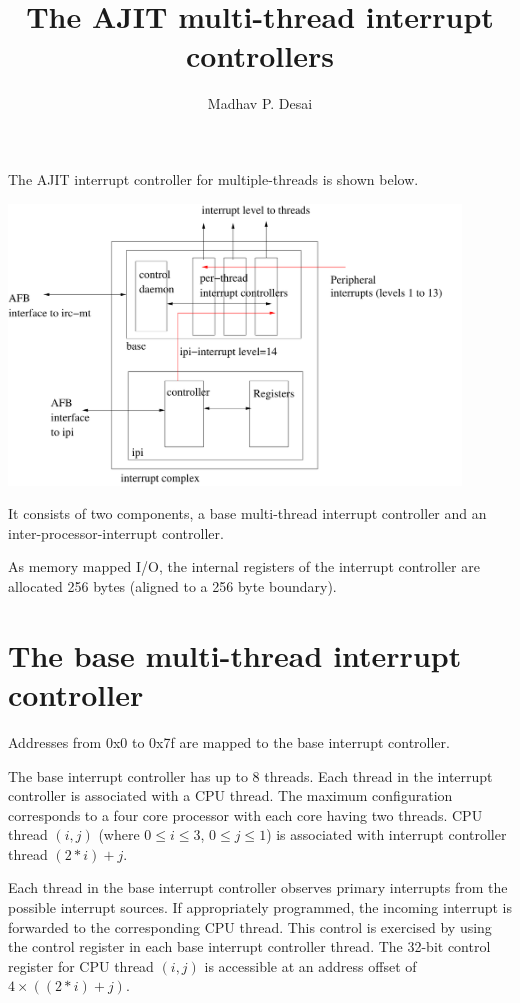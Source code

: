 \documentclass{article}[12pt]
\title{The AJIT multi-thread interrupt controllers}
\author{Madhav P. Desai}
\begin{document}
\maketitle

The AJIT interrupt controller for multiple-threads is shown below.
\begin{center}
  \includegraphics[width=12cm]{ajitInterrupt.pdf}
\end{center}
It consists of two components, a base multi-thread interrupt controller
and an inter-processor-interrupt controller.

As memory mapped I/O, the internal registers of the interrupt
controller are allocated 256 bytes (aligned to a 256 byte boundary).

\section{The base multi-thread interrupt controller}

Addresses from 0x0 to 0x7f are mapped to the base interrupt controller.

The base interrupt controller has up to 8 threads.
Each thread in the interrupt controller is associated with a CPU thread.
The maximum configuration corresponds to a four core processor with
each core having two threads.  CPU thread $(i,j)$ (where $0 \leq i \leq 3$, $0 \leq j \leq 1$)
is associated with interrupt controller thread $(2*i) + j$.

Each thread in the base interrupt controller observes primary interrupts from
the possible interrupt sources.  If appropriately programmed, the incoming interrupt
is forwarded to the corresponding CPU thread.  This control is exercised by
using the control register in each base interrupt controller  thread.   The
32-bit control register for CPU thread $(i,j)$ is accessible at an
address offset of $4 \times ((2*i) + j)$.
\end{document}
